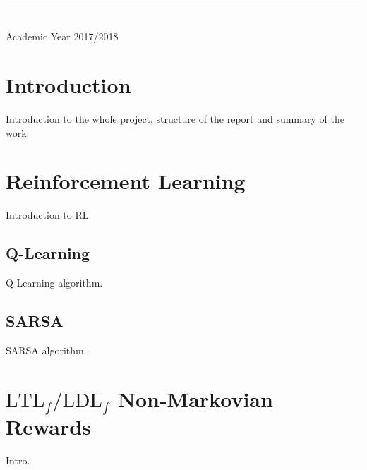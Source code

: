 \documentclass[a4paper]{article}
\begin{document}
\begin{titlepage}
\begin{minipage}{0.4\textwidth}
	\end{minipage}\\[2 cm]

    \vspace{0.2cm}
    \rule{\linewidth}{0.2 mm} \\[0.3 cm]
    \vspace*{-0.3cm}
    Academic Year 2017/2018
\end{titlepage}

\tableofcontents
\newpage




\section{Introduction}
Introduction to the whole project, structure of the report and summary of
the work.

\clearpage
\section{Reinforcement Learning}
Introduction to RL.

\subsection{Q-Learning}
Q-Learning algorithm.


\subsection{SARSA}
SARSA algorithm.


\clearpage
\section{$\text{LTL}_f/\text{LDL}_f$ Non-Markovian Rewards}
Intro.
\end{document}
